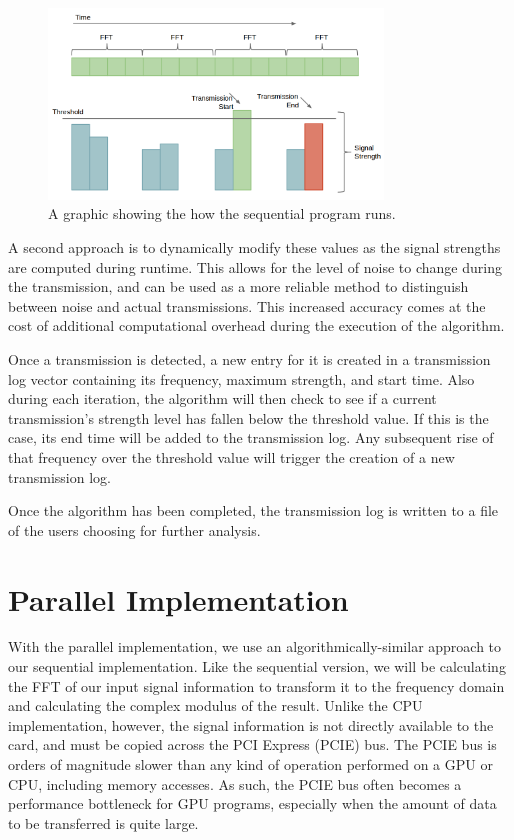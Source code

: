 \documentclass[conference]{IEEEtran}
\begin{document}
\begin{figure}[ht!]
\centering
\includegraphics[width=3.5in]{sequentialgraphic.png}
\caption{A graphic showing the how the sequential program runs.}
\label{fig:pipeline}
\end{figure}

A second approach is to dynamically modify these values as the signal strengths
are computed during runtime. This allows for the level of noise to change during
the transmission, and can be used as a more reliable method to distinguish between
noise and actual transmissions. This increased accuracy comes at the cost of
additional computational overhead during the execution of the algorithm.

Once a transmission is detected, a new entry for it is created in a transmission log vector
containing its frequency, maximum strength, and start time. Also during each iteration,
the algorithm will then check to see if a current transmission's strength level
has fallen below the threshold value. If this is the case, its end time will
be added to the transmission log. Any subsequent rise of that frequency over the
threshold value will trigger the creation of a new transmission log.

Once the algorithm has been completed, the transmission log is written to a file
of the users choosing for further analysis.

\section{Parallel Implementation}

With the parallel implementation, we use an algorithmically-similar approach 
to our sequential implementation. Like the sequential version, we will be calculating
the FFT of our input signal information to transform it to the frequency domain
and calculating the complex modulus of the result. Unlike the CPU implementation,
however, the signal information is not directly available to the card, and must
be copied across the PCI Express (PCIE) bus. The PCIE bus is orders of magnitude
slower than any kind of operation performed on a GPU or CPU, including memory
accesses. As such, the PCIE bus often becomes a performance bottleneck for
GPU programs, especially when the amount of data to be transferred is quite large.
\end{document}
